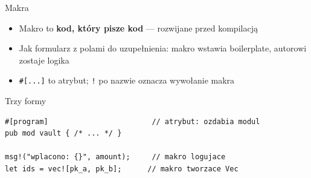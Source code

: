 \begin{frame}[fragile]{Makra}
  \begin{itemize}
    \item Makro to \textbf{kod, który pisze kod} --- rozwijane przed kompilacją
    \item Jak formularz z polami do uzupełnienia: makro wstawia boilerplate, autorowi zostaje logika
    \item \texttt{\#[...]} to atrybut; \texttt{!} po nazwie oznacza wywołanie makra
  \end{itemize}
  \begin{exampleblock}{Trzy formy}
\begin{lstlisting}
#[program]                        // atrybut: ozdabia modul
pub mod vault { /* ... */ }

msg!("wplacono: {}", amount);     // makro logujace
let ids = vec![pk_a, pk_b];      // makro tworzace Vec
\end{lstlisting}
  \end{exampleblock}
\end{frame}

